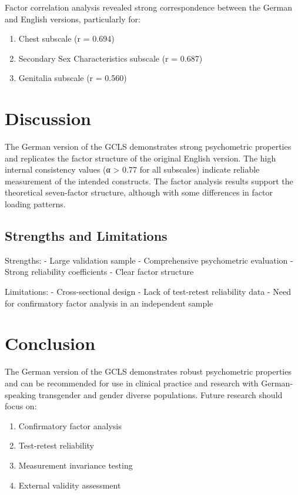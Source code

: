 \documentclass[man,floatsintext,12pt]{apa7}
\begin{document}
Factor correlation analysis revealed strong correspondence between the
German and English versions, particularly for:

\begin{enumerate}
\def\labelenumi{\arabic{enumi}.}
\tightlist
\item
  Chest subscale (r = 0.694)
\item
  Secondary Sex Characteristics subscale (r = 0.687)
\item
  Genitalia subscale (r = 0.560)
\end{enumerate}

\section{Discussion}\label{discussion}

The German version of the GCLS demonstrates strong psychometric
properties and replicates the factor structure of the original English
version. The high internal consistency values (α \textgreater{} 0.77 for
all subscales) indicate reliable measurement of the intended constructs.
The factor analysis results support the theoretical seven-factor
structure, although with some differences in factor loading patterns.

\subsection{Strengths and Limitations}\label{strengths-and-limitations}

Strengths: - Large validation sample - Comprehensive psychometric
evaluation - Strong reliability coefficients - Clear factor structure

Limitations: - Cross-sectional design - Lack of test-retest reliability
data - Need for confirmatory factor analysis in an independent sample

\section{Conclusion}\label{conclusion}

The German version of the GCLS demonstrates robust psychometric
properties and can be recommended for use in clinical practice and
research with German-speaking transgender and gender diverse
populations. Future research should focus on:

\begin{enumerate}
\def\labelenumi{\arabic{enumi}.}
\tightlist
\item
  Confirmatory factor analysis
\item
  Test-retest reliability
\item
  Measurement invariance testing
\item
  External validity assessment
\end{enumerate}
\end{document}
